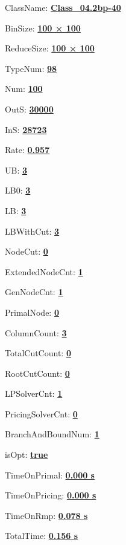 \documentclass[11pt]{article}
\begin{document}
\pagestyle{empty}


ClassName: \underline{\textbf{Class_04.2bp-40}}
\par
BinSize: \underline{\textbf{100 × 100}}
\par
ReduceSize: \underline{\textbf{100 × 100}}
\par
TypeNum: \underline{\textbf{98}}
\par
Num: \underline{\textbf{100}}
\par
OutS: \underline{\textbf{30000}}
\par
InS: \underline{\textbf{28723}}
\par
Rate: \underline{\textbf{0.957}}
\par
UB: \underline{\textbf{3}}
\par
LB0: \underline{\textbf{3}}
\par
LB: \underline{\textbf{3}}
\par
LBWithCut: \underline{\textbf{3}}
\par
NodeCut: \underline{\textbf{0}}
\par
ExtendedNodeCnt: \underline{\textbf{1}}
\par
GenNodeCnt: \underline{\textbf{1}}
\par
PrimalNode: \underline{\textbf{0}}
\par
ColumnCount: \underline{\textbf{3}}
\par
TotalCutCount: \underline{\textbf{0}}
\par
RootCutCount: \underline{\textbf{0}}
\par
LPSolverCnt: \underline{\textbf{1}}
\par
PricingSolverCnt: \underline{\textbf{0}}
\par
BranchAndBoundNum: \underline{\textbf{1}}
\par
isOpt: \underline{\textbf{true}}
\par
TimeOnPrimal: \underline{\textbf{0.000 s}}
\par
TimeOnPricing: \underline{\textbf{0.000 s}}
\par
TimeOnRmp: \underline{\textbf{0.078 s}}
\par
TotalTime: \underline{\textbf{0.156 s}}
\par
\newpage
\end{document}
